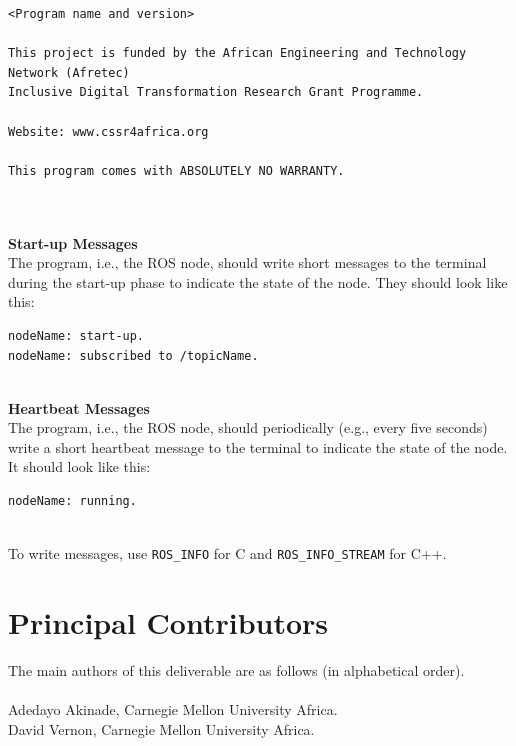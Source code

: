 \documentclass{CSSRforAfrica}
\newcommand{\blank}{~\\}
\begin{document}
\begin{appendices}
{\small
\begin{verbatim}
<Program name and version>

This project is funded by the African Engineering and Technology Network (Afretec) 
Inclusive Digital Transformation Research Grant Programme. 

Website: www.cssr4africa.org

This program comes with ABSOLUTELY NO WARRANTY.

\end{verbatim}
}
\blank
~
\blank
{\bf Start-up Messages}\\
The program, i.e., the ROS node, should write short messages to the terminal  during the start-up phase to indicate the state of the node. They should look like this:
{\small
\begin{verbatim}
nodeName: start-up.
nodeName: subscribed to /topicName.
\end{verbatim}
} 

\blank
{\bf Heartbeat Messages}\\
The program, i.e., the ROS node, should periodically (e.g., every five seconds) write a short heartbeat message to the terminal to indicate the state of the node. It should look like this:
{\small
\begin{verbatim}
nodeName: running.
\end{verbatim}
} 
\blank
\noindent
To write messages, use {\small \verb+ROS_INFO+} for C and {\small \verb+ROS_INFO_STREAM+} for C++.

 

\newpage  
 

\end{appendices}


 
\newpage

                                 



\pagebreak
\section*{Principal Contributors}
\label{contributors}
The main authors of this deliverable are as follows (in alphabetical order).
\blank
~
\blank
Adedayo Akinade, Carnegie Mellon University Africa.\\     
David Vernon, Carnegie Mellon University Africa.\\     
\end{document}
